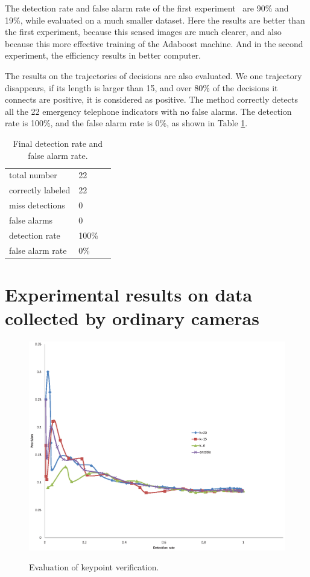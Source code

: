 The detection rate and false alarm rate of the first experiment~\cite{wang1} are 90\% and 19\%, while evaluated on a much smaller dataset. Here the results are better than the first experiment, because this sensed images are much clearer, and also because this more effective training of the Adaboost machine. And in the second experiment, the efficiency results in better computer.

The results on the trajectories of decisions are also evaluated. We one trajectory disappears, if its length is larger than 15, and over 80\% of the decisions it connects are positive, it is considered as positive. The method correctly detects all the 22 emergency telephone indicators with no false alarms. The detection rate is 100\%, and the false alarm rate is 0\%, as shown in Table \ref{tb:tb3}.

\begin{table}[h]
\centering
\begin{tabular}{lll}
     \hline
     \hline
    total number & 22  \\
    correctly labeled &	22   \\
    miss detections &	0 &	  \\
    false alarms &	0    \\
    detection rate &	100\% &	  \\
    false alarm rate &	0\% &	   \\
   \hline
\end{tabular}
\caption[Final detection rate and false alarm rate]{Final detection rate and false alarm rate.}\label{tb:tb3}
\end{table}

\section{Experimental results on data collected by ordinary cameras}
\label{ord}


\begin{figure}
{
  \includegraphics{kptkms.eps}
}
\caption[Evaluation of keypoint verification]{Evaluation of keypoint verification.}
\label{ord:one}
\end{figure}

